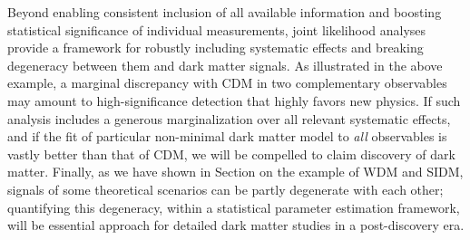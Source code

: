 \documentclass[modern,linenumbers]{aastex62}
\begin{document}
Beyond enabling consistent inclusion of all available information and boosting statistical significance of individual measurements, joint likelihood analyses provide a framework for robustly including systematic effects and breaking degeneracy between them and dark matter signals. 
As illustrated in the above example, a marginal discrepancy with CDM in two complementary observables may amount to high-significance detection that highly favors new physics. 
If such analysis includes a generous marginalization over all relevant systematic effects, and if the fit of particular non-minimal dark matter model to \textit{all} observables is vastly better than that of CDM, we will be compelled to claim discovery of dark matter. 
Finally, as we have shown in Section  on the example of WDM and SIDM, signals of some theoretical scenarios can be partly degenerate with each other; quantifying this degeneracy, within a statistical parameter estimation framework, will be essential approach for detailed dark matter studies in a post-discovery era.



\end{document}
